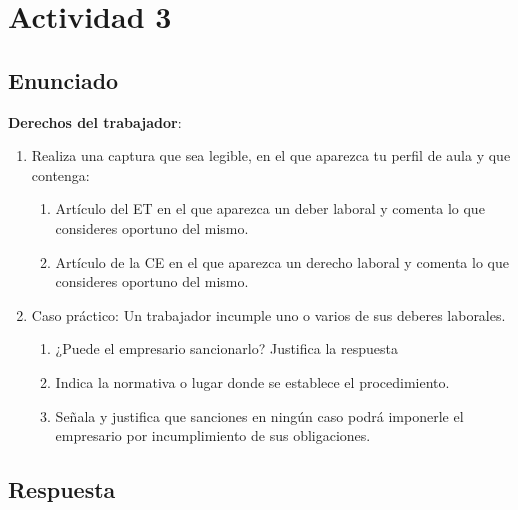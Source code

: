 \section{Actividad 3}
\subsection{Enunciado}
\textbf{Derechos del trabajador}:
\begin{enumerate}
    \item Realiza una captura que sea legible, en el que aparezca tu perfil de aula y que contenga:
    \begin{enumerate}
        \item Artículo del ET  en el que aparezca un deber laboral y comenta lo que consideres oportuno del mismo.
        \item Artículo de la CE en el que aparezca un derecho laboral  y comenta lo que consideres oportuno del mismo.
    \end{enumerate}
    \item Caso práctico: Un trabajador incumple uno o varios de sus deberes laborales.
    \begin{enumerate}
        \item ¿Puede el empresario sancionarlo? Justifica la respuesta
        \item Indica la normativa o lugar donde se establece el procedimiento.
        \item Señala y justifica que sanciones en ningún caso podrá imponerle el empresario por incumplimiento de sus obligaciones.
    \end{enumerate}
\end{enumerate}

\subsection{Respuesta}

